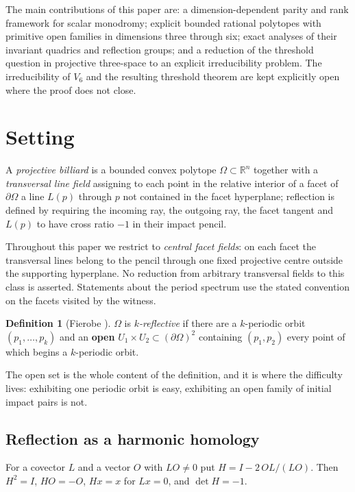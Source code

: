 \documentclass[11pt,a4paper]{article}
\theoremstyle{plain}
\theoremstyle{definition}
\newtheorem{definition}[theorem]{Definition}
\theoremstyle{remark}
\begin{document}
The main contributions of this paper are: a dimension-dependent parity and rank
framework for scalar monodromy; explicit bounded rational polytopes with
primitive open families in dimensions three through six; exact analyses of their
invariant quadrics and reflection groups; and a reduction of the threshold
question in projective three-space to an explicit irreducibility problem.  The
irreducibility of $V_6$ and the resulting threshold theorem are kept explicitly
open where the proof does not close.
\section{Setting}\label{sec:setting}

A \emph{projective billiard} \cite{tab} is a bounded convex polytope
$\Omega\subset\mathbb{R}^n$ together with a \emph{transversal line field}
assigning to each point in the relative interior of a facet of $\partial\Omega$
a line $L(p)$ through $p$ not contained in the facet hyperplane; reflection is
defined by requiring the incoming ray, the outgoing ray, the facet tangent and
$L(p)$ to have cross ratio $-1$ in their impact pencil.

Throughout this paper we restrict to \emph{central facet fields}: on each
facet the transversal lines belong to the pencil through one fixed projective
centre outside the supporting hyperplane. No reduction from arbitrary
transversal fields to this class is asserted. Statements about the period
spectrum use the stated convention on the facets visited by the witness.

\begin{definition}[Fierobe \cite{fie-ex}]\label{def:krefl}
$\Omega$ is \emph{$k$-reflective} if there are a $k$-periodic orbit
$(p_1,\dots,p_k)$ and an \textbf{open} $U_1\times U_2\subset(\partial\Omega)^2$
containing $(p_1,p_2)$ every point of which begins a $k$-periodic orbit.
\end{definition}

The open set is the whole content of the definition, and it is where the difficulty
lives: exhibiting one periodic orbit is easy, exhibiting an open family of initial
impact pairs is not.

\subsection{Reflection as a harmonic homology}

For a covector $L$ and a vector $O$ with $LO\neq0$ put $H=I-2\,OL/(LO)$. Then
$H^2=I$, $HO=-O$, $Hx=x$ for $Lx=0$, and $\det H=-1$.
\end{document}
